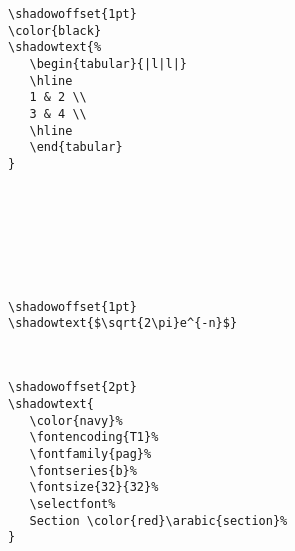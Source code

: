 \documentclass{article}
\begin{document}
\begin{minipage}{\textwidth}
\begin{multicols*}{2} 
{\footnotesize
\begin{verbatim}
\shadowoffset{1pt}
\color{black}
\shadowtext{%
   \begin{tabular}{|l|l|}
   \hline
   1 & 2 \\
   3 & 4 \\
   \hline
   \end{tabular}
}
\end{verbatim}}

\shadowoffset{1pt}
\phantom{}\\
\phantom{}\\
\phantom{}\\
\phantom{}\\
\phantom{}\\
\phantom{}
\end{multicols*}
\end{minipage}





\begin{minipage}{\textwidth}
\begin{multicols*}{2} 
{\footnotesize
\begin{verbatim}
\shadowoffset{1pt}
\shadowtext{$\sqrt{2\pi}e^{-n}$}
\end{verbatim}}

\shadowoffset{1pt}
\\
\phantom{}
\end{multicols*}
\end{minipage}

\color{black}

\begin{minipage}{\textwidth}
\begin{multicols*}{2} 
{\footnotesize
\begin{verbatim}
\shadowoffset{2pt}
\shadowtext{
   \color{navy}%
   \fontencoding{T1}%
   \fontfamily{pag}%
   \fontseries{b}%
   \fontsize{32}{32}%
   \selectfont%
   Section \color{red}\arabic{section}%
}
\end{verbatim}}

\shadowoffset{2pt}
\phantom{}\\
\phantom{}\\
\phantom{}\\
\phantom{}\\
\phantom{}\\
\end{multicols*}
\end{minipage}
\end{document}
